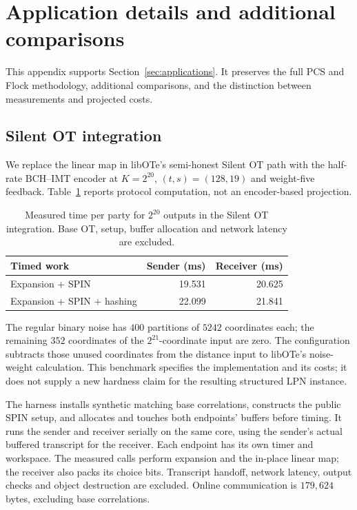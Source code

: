 \section{Application details and additional comparisons}
\label{app:applications}

This appendix supports Section~\ref{sec:applications}.
It preserves the full PCS and Flock methodology, additional comparisons,
and the distinction between measurements and projected costs.

\subsection{Silent OT integration}
\label{app:pcg-details}
We replace the linear map in libOTe's semi-honest Silent OT path with the
half-rate BCH--IMT encoder at $K=2^{20}$, $(t,s)=(128,19)$ and weight-five
feedback. Table~\ref{tab:spin-ot} reports protocol computation, not an
encoder-based projection.

\begin{table}[!htbp]
\centering
\caption{Measured time per party for $2^{20}$ outputs in the Silent OT
integration. Base OT, setup, buffer allocation and network latency are excluded.}
\label{tab:spin-ot}
\begin{tabular}{@{}lrr@{}}
\toprule
Timed work & Sender (ms) & Receiver (ms) \\
\midrule
Expansion + SPIN & 19.531 & 20.625 \\
Expansion + SPIN + hashing & 22.099 & 21.841 \\
\bottomrule
\end{tabular}
\end{table}

The regular binary noise has $400$ partitions of $5242$ coordinates each;
the remaining $352$ coordinates of the $2^{21}$-coordinate input are zero.
The configuration subtracts those unused coordinates from the distance
input to libOTe's noise-weight calculation. This benchmark specifies the
implementation and its costs; it does not supply a new hardness claim for
the resulting structured LPN instance.

The harness installs synthetic matching base correlations, constructs the
public SPIN setup, and allocates and touches both endpoints' buffers before
timing. It runs the sender and receiver serially on the same core, using
the sender's actual buffered transcript for the receiver. Each endpoint
has its own timer and workspace. The measured calls perform expansion
and the in-place linear map; the receiver also packs its choice bits.
Transcript handoff, network latency, output checks and object destruction
are excluded. Online communication is $179{,}624$ bytes, excluding base
correlations.

